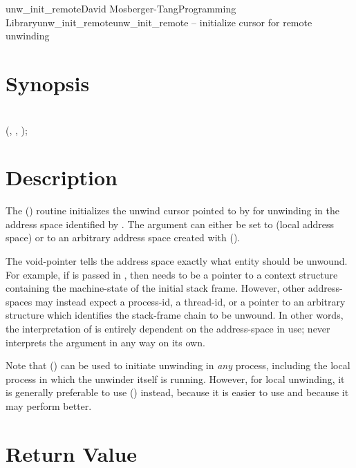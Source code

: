 \documentclass{article}
\begin{document}
\begin{Name}{3}{unw\_init\_remote}{David Mosberger-Tang}{Programming Library}{unw\_init\_remote}unw\_init\_remote -- initialize cursor for remote unwinding
\end{Name}

\section{Synopsis}

\\

 (, , );\\

\section{Description}

The () routine initializes the unwind cursor
pointed to by  for unwinding in the address space identified by
.  The  argument can either be set to
 (local address space) or to an arbitrary
address space created with ().

The  void-pointer tells the address space exactly what entity
should be unwound.  For example, if  is
passed in , then  needs to be a pointer to a context
structure containing the machine-state of the initial stack frame.
However, other address-spaces may instead expect a process-id, a
thread-id, or a pointer to an arbitrary structure which identifies the
stack-frame chain to be unwound.  In other words, the interpretation
of  is entirely dependent on the address-space in use;
 never interprets the argument in any way on its own.

Note that () can be used to initiate unwinding
in \emph{any} process, including the local process in which the
unwinder itself is running.  However, for local unwinding, it is
generally preferable to use () instead, because
it is easier to use and because it may perform better.

\section{Return Value}
\end{document}
